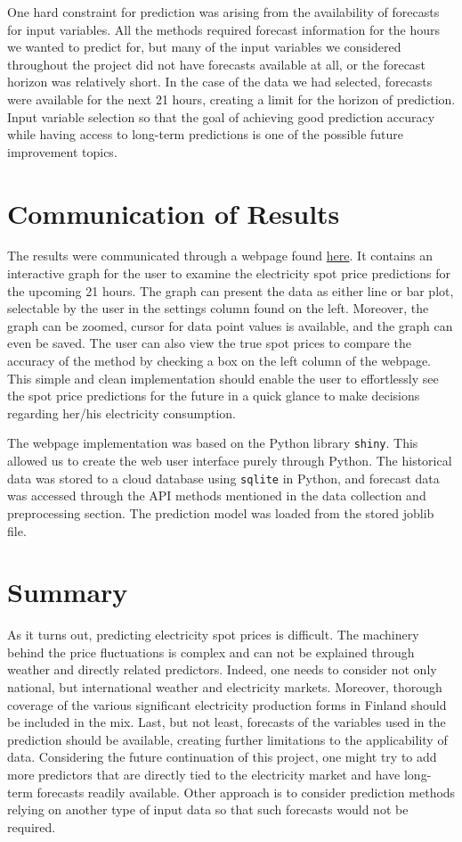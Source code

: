 \documentclass{article}
\numberwithin{equation}{section}
\begin{document}
One hard constraint for prediction was arising from the availability of forecasts for input variables. All the methods required forecast information for the hours we wanted to predict for, but many of the input variables we considered throughout the project did not have forecasts available at all, or the forecast horizon was relatively short. In the case of the data we had selected, forecasts were available for the next 21 hours, creating a limit for the horizon of prediction. Input variable selection so that the goal of achieving good prediction accuracy while having access to long-term predictions is one of the possible future improvement topics.

\section{Communication of Results}
The results were communicated through a webpage found \href{https://connect.posit.cloud/AhsanAbbas101/content/0192c52c-7101-3655-bc34-0e4733cd46de}{here}. It contains an interactive graph for the user to examine the electricity spot price predictions for the upcoming 21 hours. The graph can present the data as either line or bar plot, selectable by the user in the settings column found on the left. Moreover, the graph can be zoomed, cursor for data point values is available, and the graph can even be saved. The user can also view the true spot prices to compare the accuracy of the method by checking a box on the left column of the webpage. This simple and clean implementation should enable the user to effortlessly see the spot price predictions for the future in a quick glance to make decisions regarding her/his electricity consumption.

The webpage implementation was based on the Python library \verb|shiny|. This allowed us to create the web user interface purely through Python. The historical data was stored to a cloud database using \verb|sqlite| in Python, and forecast data was accessed through the API methods mentioned in the data collection and preprocessing section. The prediction model was loaded from the stored joblib file.


\section{Summary}
As it turns out, predicting electricity spot prices is difficult. The machinery behind the price fluctuations is complex and can not be explained through weather and directly related predictors. Indeed, one needs to consider not only national, but international weather and electricity markets. Moreover, thorough coverage of the various significant electricity production forms in Finland should be included in the mix. Last, but not least, forecasts of the variables used in the prediction should be available, creating further limitations to the applicability of data. Considering the future continuation of this project, one might try to add more predictors that are directly tied to the electricity market and have long-term forecasts readily available. Other approach is to consider prediction methods relying on another type of input data so that such forecasts would not be required.
\end{document}
